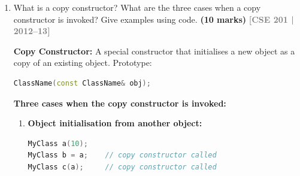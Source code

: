 \documentclass[12pt,a3paper]{article}
\newcommand{\yr}[1]{\hfill\textcolor{gray}{\small\textbf{[#1]}}}
\newcommand{\mk}[1]{\textcolor{orange!70!black}{\small\textbf{(#1 marks)}}}
\begin{document}
\begin{enumerate}
\begin{tcolorbox}
\textbf{The problem:} When a \texttt{myclass} object is passed by
value, the default copy constructor makes a shallow copy---both the
original and the parameter share the same \texttt{malloc}-allocated
integer.  When the function returns, the parameter's destructor calls
\texttt{free(p)}, freeing the shared memory.  The original now holds
a \textbf{dangling pointer}; its destructor causes a
\textbf{double-free crash}.

\begin{lstlisting}[language=C++]
#include <iostream>
#include <cstdlib>
using namespace std;

class myclass {
    int *p;
public:
    myclass(int i) { p = (int*)malloc(sizeof(int)); *p = i; }

    // Deep copy constructor
    myclass(const myclass& obj) {
        p = (int*)malloc(sizeof(int));
        *p = *obj.p;
    }

    ~myclass() { free(p); cout << "Freeing..\n"; }
    int get()  { return *p; }
};

void display(myclass ob) { cout << ob.get() << "\n"; }

int main() {
    myclass a(100);
    display(a);      // deep copy; a is safe
    cout << a.get(); // 100
}
\end{lstlisting}

\end{tcolorbox}

\item What is a copy constructor? What are the three cases when a copy constructor is invoked? Give examples using code. \mk{10}
\yr{CSE 201 | 2012--13}


\begin{tcolorbox}[enhanced,breakable,ansbox,colback=cE!4,colframe=cE,
  boxrule=0.8pt,arc=5pt,
  title={\textbf{Answer --- Copy constructor --- definition and 3 invocation cases}},
  fonttitle=\bfseries\color{white},colbacktitle=cE]

\textbf{Copy Constructor:} A special constructor that initialises a
new object as a copy of an existing object.  Prototype:
\begin{lstlisting}[language=C++]
ClassName(const ClassName& obj);
\end{lstlisting}

\textbf{Three cases when the copy constructor is invoked:}

\begin{enumerate}[label=\textbf{\arabic*.}]
  \item \textbf{Object initialisation from another object:}
\begin{lstlisting}[language=C++]
MyClass a(10);
MyClass b = a;    // copy constructor called
MyClass c(a);     // copy constructor called
\end{lstlisting}


\end{enumerate}
\end{tcolorbox}
\end{enumerate}
\end{document}
